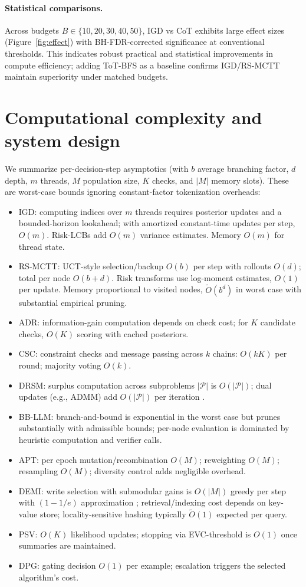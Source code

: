 \paragraph{Statistical comparisons.}
Across budgets $B\in\{10,20,30,40,50\}$, IGD vs CoT exhibits large effect sizes (Figure~\ref{fig:effect}) with BH-FDR-corrected significance at conventional thresholds. This indicates robust practical and statistical improvements in compute efficiency; adding ToT-BFS as a baseline confirms IGD/RS-MCTT maintain superiority under matched budgets.

\section{Computational complexity and system design}

We summarize per-decision-step asymptotics (with $b$ average branching factor, $d$ depth, $m$ threads, $M$ population size, $K$ checks, and $|M|$ memory slots). These are worst-case bounds ignoring constant-factor tokenization overheads:
\begin{itemize}[leftmargin=1.6em, itemsep=0.2em]
\item IGD: computing indices over $m$ threads requires posterior updates and a bounded-horizon lookahead; with amortized constant-time updates per step, $O(m)$. Risk-LCBs add $O(m)$ variance estimates. Memory $O(m)$ for thread state.
\item RS-MCTT: UCT-style selection/backup $O(b)$ per step with rollouts $O(d)$; total per node $O(b + d)$. Risk transforms use log-moment estimates, $O(1)$ per update. Memory proportional to visited nodes, $\tilde{O}(b^d)$ in worst case with substantial empirical pruning.
\item ADR: information-gain computation depends on check cost; for $K$ candidate checks, $O(K)$ scoring with cached posteriors.
\item CSC: constraint checks and message passing across $k$ chains: $O(kK)$ per round; majority voting $O(k)$.
\item DRSM: surplus computation across subproblems $|\mathcal{P}|$ is $O(|\mathcal{P}|)$; dual updates (e.g., ADMM) add $O(|\mathcal{P}|)$ per iteration \cite{boyd2011admm}.
\item BB-LLM: branch-and-bound is exponential in the worst case but prunes substantially with admissible bounds; per-node evaluation is dominated by heuristic computation and verifier calls.
\item APT: per epoch mutation/recombination $O(M)$; reweighting $O(M)$; resampling $O(M)$; diversity control adds negligible overhead.
\item DEMI: write selection with submodular gains is $O(|M|)$ greedy per step with $(1-1/e)$ approximation \cite{sviridenko2004}; retrieval/indexing cost depends on key-value store; locality-sensitive hashing typically $\tilde{O}(1)$ expected per query.
\item PSV: $O(K)$ likelihood updates; stopping via EVC-threshold is $O(1)$ once summaries are maintained.
\item DPG: gating decision $O(1)$ per example; escalation triggers the selected algorithm’s cost.
\end{itemize}
